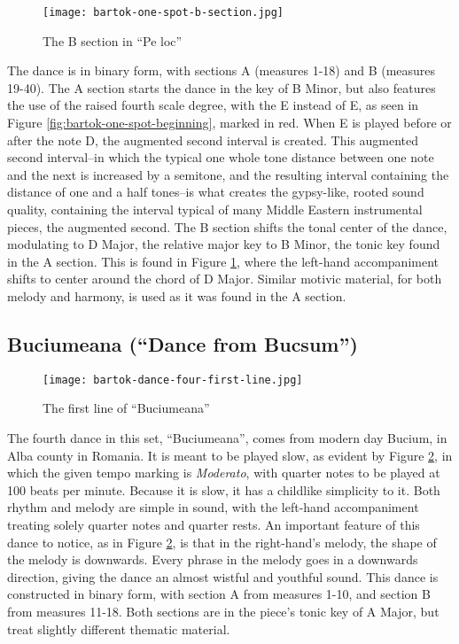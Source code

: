\begin{figure}
  \centering
  \texttt{[image: bartok-one-spot-b-section.jpg]}
  \caption[The B section of ``Pe loc'', of Bartok's \textit{Romanian Folk Dances, Sz. 56, BB 68}]{The B section in ``Pe loc''}
  \label{fig:bartok-one-spot-b-section}
\end{figure}

The dance is in binary form, with sections A (measures 1-18) and B (measures 19-40). The A section starts the dance in the key of B Minor, but also features the use of the raised fourth scale degree, with the E\musSharp{} instead of E, as seen in Figure \ref{fig:bartok-one-spot-beginning}\autocite{Lung_2016}, marked in red. When E\musSharp{} is played before or after the note D, the augmented second interval is created. This augmented second interval--in which the typical one whole tone distance between one note and the next is increased by a semitone, and the resulting interval containing the distance of one and a half tones--is what creates the gypsy-like, rooted sound quality, containing the interval typical of many Middle Eastern instrumental pieces, the augmented second. The B section shifts the tonal center of the dance, modulating to D Major, the relative major key to B Minor, the tonic key found in the A section. This is found in Figure \ref{fig:bartok-one-spot-b-section}\autocite{Lung_2016}, where the left-hand accompaniment shifts to center around the chord of D Major. Similar motivic material, for both melody and harmony, is used as it was found in the A section.

\subsection{Buciumeana (``Dance from Bucsum'')}

\begin{figure}
  \centering
  \texttt{[image: bartok-dance-four-first-line.jpg]}
  \caption[The first line of ``Buciumeana'' of Bartok's \textit{Romanian Folk Dances}, Sz. 56, BB 68]{The first line of ``Buciumeana''}
  \label{fig:bartok-dance-four-first-line}
\end{figure}


The fourth dance in this set, ``Buciumeana'', comes from modern day Bucium, in Alba county in Romania. It is meant to be played slow, as evident by Figure \ref{fig:bartok-dance-four-first-line}\autocite{Lung_2016}, in which the given tempo marking is \textit{Moderato}, with quarter notes to be played at 100 beats per minute. Because it is slow, it has a childlike simplicity to it. Both rhythm and melody are simple in sound, with the left-hand accompaniment treating solely quarter notes and quarter rests. An important feature of this dance to notice, as in Figure \ref{fig:bartok-dance-four-first-line}\autocite{Lung_2016}, is that in the right-hand's melody, the shape of the melody is downwards. Every phrase in the melody goes in a downwards direction, giving the dance an almost wistful and youthful sound. This dance is constructed in binary form, with section A from measures 1-10, and section B from measures 11-18. Both sections are in the piece's tonic key of A Major, but treat slightly different thematic material. 

